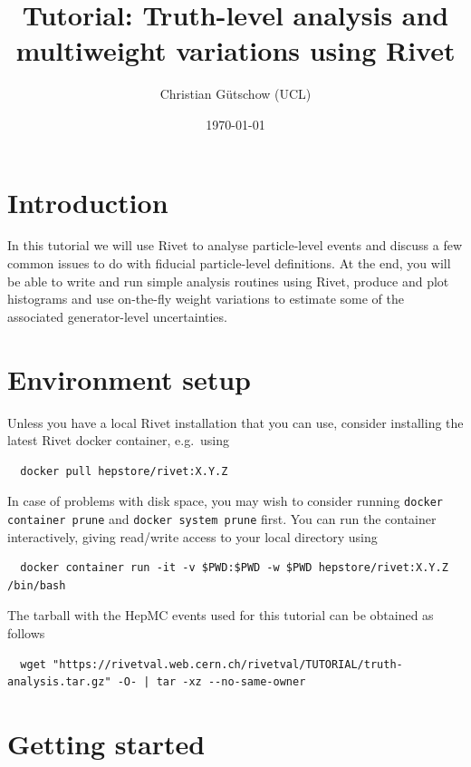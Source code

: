 \documentclass[10pt,fleqn]{scrartcl}
\theoremstyle{exstyle}
\begin{document}
\title{\vspace*{-2em} Tutorial: Truth-level analysis and multiweight variations using Rivet}
\author{Christian G\"{u}tschow (UCL)}
\date{\monthyeardate\today}
\maketitle

\section{Introduction}

In this tutorial we will use Rivet to analyse particle-level events
and discuss a few common issues to do with fiducial particle-level definitions.
At the end, you will be able to write and run simple analysis routines using
Rivet, produce and plot histograms and use on-the-fly weight variations to
estimate some of the associated generator-level uncertainties.

\section{Environment setup}

Unless you have a local Rivet installation that you can use, consider installing the latest Rivet docker container, e.g.\ using
\begin{verbatim}
  docker pull hepstore/rivet:X.Y.Z
\end{verbatim}
In case of problems with disk space, you may wish to consider running
{\texttt{docker container prune}} and {\texttt{docker system prune}} first.
You can run the container interactively, giving read/write access to your local directory using
\begin{footnotesize}
\begin{verbatim}
  docker container run -it -v $PWD:$PWD -w $PWD hepstore/rivet:X.Y.Z /bin/bash
\end{verbatim}
\end{footnotesize}
\noindent The tarball with the HepMC events used for this tutorial can be obtained as follows
\begin{footnotesize}
\begin{verbatim}
  wget "https://rivetval.web.cern.ch/rivetval/TUTORIAL/truth-analysis.tar.gz" -O- | tar -xz --no-same-owner
\end{verbatim}
\end{footnotesize}

\section{Getting started}
\end{document}
